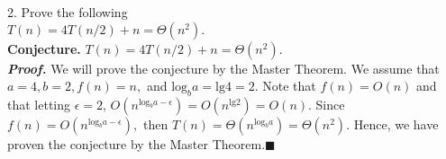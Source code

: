 \documentclass{article}
\begin{document}
2. Prove the following\\
$T(n) = 4T(n / 2) + n = \Theta(n^2).$\\

\textbf{Conjecture.} $T(n) = 4T(n / 2) + n = \Theta(n^2).$\\
\textit{\textbf{Proof.}} We will prove the conjecture by the Master Theorem. We assume that $a = 4, b = 2, f(n) = n,$ and $\text{log}_b a = \text{lg} 4 = 2$. Note that $f(n) = O(n)$ and that letting $\epsilon = 2$, $O(n^{\text{log}_b a - \epsilon}) = O(n^{\text{lg} 2}) = O(n).$ Since $f(n) = O(n^{\text{log}_b a - \epsilon}),$ then $T(n) = \Theta(n^{\text{log}_b a}) = \Theta(n^2).$ Hence, we have proven the conjecture by the Master Theorem.\hfill$\blacksquare$
\end{document}
